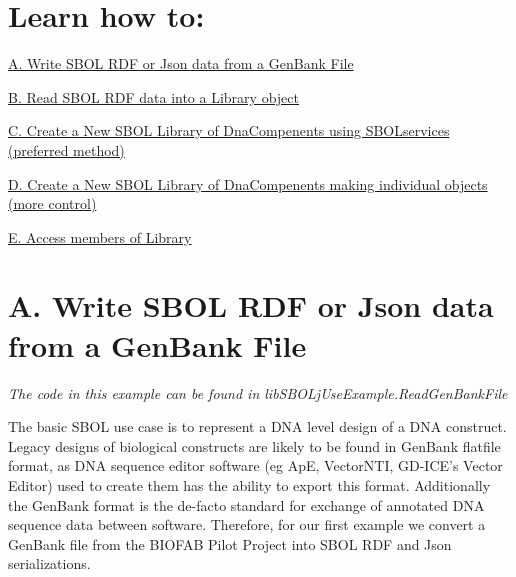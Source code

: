 \hypertarget{tutorial_sec_toc}{}\section{Learn how to:}\label{tutorial_sec_toc}
\hyperlink{tutorial_A}{A. Write SBOL RDF or Json data from a GenBank File} \par
 \hyperlink{tutorial_B}{B. Read SBOL RDF data into a Library object} \par
 \hyperlink{tutorial_C}{C. Create a New SBOL Library of DnaCompenents using SBOLservices (preferred method)} \par
 \hyperlink{tutorial_D}{D. Create a New SBOL Library of DnaCompenents making individual objects (more control)} \par
 \hyperlink{tutorial_E}{E. Access members of Library} \par




\hypertarget{tutorial_A}{}\section{A. Write SBOL RDF or Json data from a GenBank File}\label{tutorial_A}
{\itshape The code in this example can be found in libSBOLjUseExample.ReadGenBankFile\/}

The basic SBOL use case is to represent a DNA level design of a DNA construct. Legacy designs of biological constructs are likely to be found in GenBank flatfile format, as DNA sequence editor software (eg ApE, VectorNTI, GD-\/ICE's Vector Editor) used to create them has the ability to export this format. Additionally the GenBank format is the de-\/facto standard for exchange of annotated DNA sequence data between software. Therefore, for our first example we convert a GenBank file from the BIOFAB Pilot Project into SBOL RDF and Json serializations.


